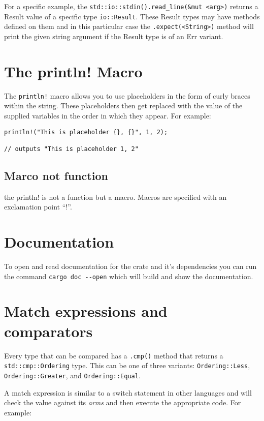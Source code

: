 \documentclass[12pt,notitlepage]{article}
\begin{document}
For a specific example, the \lstinline{std::io::stdin().read_line(&mut <arg>)}
returns a Result value of a specific type \lstinline{io::Result}. These Result
types may have methods defined on them and in this particular case the
\lstinline{.expect(<String>)} method will print the given string argument if
the Result type is of an Err variant.

\section{The println! Macro}

The \lstinline{println!} macro allows you to use placeholders in the form of
curly braces within the string. These placeholders then get replaced with the
value of the supplied variables in the order in which they appear. For example:

\begin{lstlisting}
println!("This is placeholder {}, {}", 1, 2);

// outputs "This is placeholder 1, 2"

\end{lstlisting}

\subsection{Marco not function}

the println! is not a function but a macro. Macros are specified with an
exclamation point ``!''.

\section{Documentation}

To open and read documentation for the crate and it's dependencies you can run
the command \lstinline{cargo doc --open} which will build and show the
documentation.

\section{Match expressions and comparators}

Every type that can be compared has a \lstinline{.cmp()} method that returns a
\lstinline{std::cmp::Ordering} type. This can be one of three variants:
\lstinline{Ordering::Less}, \lstinline{Ordering::Greater}, and
\lstinline{Ordering::Equal}.

A match expression is similar to a switch statement in other languages and will
check the value against its \emph{arms} and then execute the appropriate code.
For example:
\end{document}
